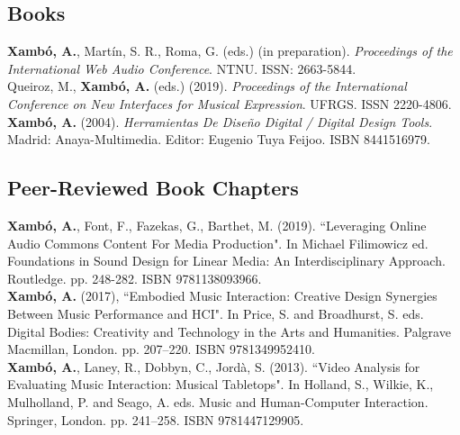 \documentclass[10pt, a4paper]{article}
\newcommand{\years}[1]{\marginnote{\scriptsize #1}}
\begin{document}
\subsection*{Books}
\noindent

\years{2020}\textbf{Xambó, A.},  Martín, S. R., Roma, G. (eds.) (in preparation). \emph{Proceedings of the International Web Audio Conference}. NTNU. ISSN: 2663-5844.\\
\years{2019}Queiroz, M., \textbf{Xambó, A.} (eds.) (2019). \emph{Proceedings of the International Conference on New Interfaces for Musical Expression}. UFRGS. ISSN 2220-4806.\\
\years{2004}\textbf{Xambó, A.} (2004). \emph{Herramientas De Diseño Digital / Digital Design Tools}. Madrid: Anaya-Multimedia. Editor: Eugenio Tuya Feijoo. ISBN 8441516979.

\subsection*{Peer-Reviewed Book Chapters}
\noindent

\years{2019}\textbf{Xambó, A.}, Font, F., Fazekas, G., Barthet, M. (2019). “Leveraging Online Audio Commons Content For Media Production". In Michael Filimowicz ed. Foundations in Sound Design for Linear Media: An Interdisciplinary Approach. Routledge. pp. 248-282. ISBN 9781138093966.\\
\years{2016}\textbf{Xambó, A.} (2017), “Embodied Music Interaction: Creative Design Synergies Between Music Performance and HCI". In Price, S. and Broadhurst, S. eds. Digital Bodies: Creativity and Technology in the Arts and Humanities. Palgrave Macmillan, London. pp. 207--220. ISBN 9781349952410.\\
\years{2013}\textbf{Xambó, A.}, Laney, R., Dobbyn, C., Jordà, S. (2013). “Video Analysis for Evaluating Music Interaction: Musical Tabletops". In Holland, S., Wilkie, K., Mulholland, P. and Seago, A. eds. Music and Human-Computer Interaction. Springer, London. pp. 241--258. ISBN 9781447129905.
\end{document}
